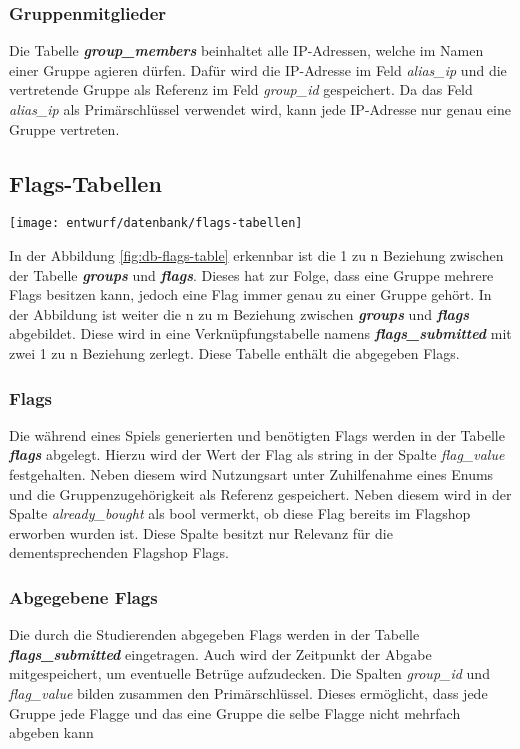 \subsubsection{Gruppenmitglieder}
Die Tabelle \textbf{\textit{group\_members}} beinhaltet alle IP-Adressen, welche im Namen einer Gruppe agieren dürfen. Dafür wird die IP-Adresse im Feld \textit{alias\_ip} und die vertretende Gruppe als Referenz im Feld \textit{group\_id} gespeichert. Da das Feld \textit{alias\_ip} als Primärschlüssel verwendet wird, kann jede IP-Adresse nur genau eine Gruppe vertreten.

\subsection{Flags-Tabellen}
\begin{center}
	\texttt{[image: entwurf/datenbank/flags-tabellen]}
	\label{fig:db-flags-table}
\end{center}


In der Abbildung \ref{fig:db-flags-table} erkennbar ist die 1 zu n Beziehung zwischen der Tabelle \textbf{\textit{groups}} und \textbf{\textit{flags}}. Dieses hat zur Folge, dass eine Gruppe mehrere Flags besitzen kann, jedoch eine Flag immer genau zu einer Gruppe gehört. In der Abbildung ist weiter die n zu m Beziehung zwischen \textbf{\textit{groups}} und \textbf{\textit{flags}} abgebildet. Diese wird in eine Verknüpfungstabelle namens \textbf{\textit{flags\_submitted}} mit zwei 1 zu n Beziehung zerlegt. Diese Tabelle enthält die abgegeben Flags.
 
\subsubsection{Flags}
Die während eines Spiels generierten und benötigten Flags werden in der Tabelle \textbf{\textit{flags}} abgelegt. Hierzu wird der Wert der Flag als string in der Spalte \textit{flag\_value} festgehalten. Neben diesem wird Nutzungsart unter Zuhilfenahme eines Enums und die Gruppenzugehörigkeit als Referenz gespeichert. Neben diesem wird in der Spalte \textit{already\_bought} als bool vermerkt, ob diese Flag bereits im Flagshop erworben wurden ist. Diese Spalte besitzt nur Relevanz für die dementsprechenden Flagshop Flags.

\subsubsection{Abgegebene Flags}
Die durch die Studierenden abgegeben Flags werden in der Tabelle \textbf{\textit{flags\_submitted}} eingetragen. Auch wird der Zeitpunkt der Abgabe mitgespeichert, um eventuelle Betrüge aufzudecken. Die Spalten \textit{group\_id} und \textit{flag\_value} bilden zusammen den Primärschlüssel. Dieses ermöglicht, dass jede Gruppe jede Flagge und das eine Gruppe die selbe Flagge nicht mehrfach abgeben kann

